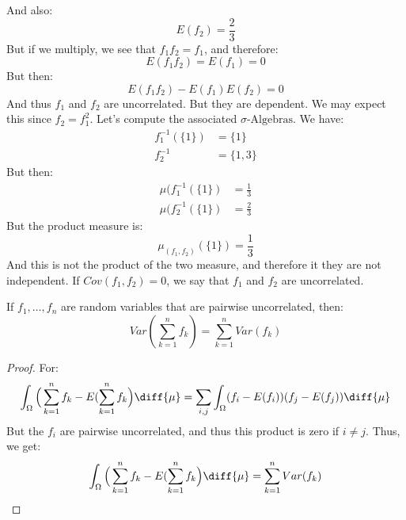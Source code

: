        And also:
        \begin{equation}
            E(f_{2})=\frac{2}{3}
        \end{equation}
        But if we multiply, we see that
        $f_{1}f_{2}=f_{1}$, and therefore:
        \begin{equation}
            E(f_{1}f_{2})=E(f_{1})=0
        \end{equation}
        But then:
        \begin{equation}
            E(f_{1}f_{2})-E(f_{1})E(f_{2})=0
        \end{equation}
        And thus $f_{1}$ and $f_{2}$ are uncorrelated.
        But they are dependent. We may expect this since
        $f_{2}=f_{1}^{2}$. Let's compute the associated
        $\sigma\textrm{-Algebras}$. We have:
        \begin{align}
            f_{1}^{\minus{1}}(\{1\})
            &=\{1\}\\
            f_{2}^{\minus{1}}&=\{1,3\}
        \end{align}
        But then:
        \begin{align}
            \mu(f_{1}^{\minus{1}}(\{1\})
            &=\frac{1}{3}\\
            \mu(f_{2}^{\minus{1}}(\{1\})&=\frac{2}{3}
        \end{align}
        But the product measure is:
        \begin{equation}
            \mu_{(f_{1},f_{2})}(\{1\})=\frac{1}{3}
        \end{equation}
        And this is not the product of the two measure, and
        therefore it they are not independent.
        If $Cov(f_{1},f_{2})=0$, we say that $f_{1}$ and
        $f_{2}$ are uncorrelated.
        \begin{theorem}
            If $f_{1},\dots,f_{n}$ are random variables
            that are pairwise uncorrelated, then:
            \begin{equation}
                Var(\sum_{k=1}^{n}f_{k})=
                \sum_{k=1}^{n}Var(f_{k})
            \end{equation}
        \end{theorem}
        \begin{proof}
            For:
            \begin{equation}
                \int_{\Omega}
                    \Big(\sum_{k=1}^{n}f_{k}-
                        E(\sum_{k=1}^{n}f_{k}\Big)\diff{\mu}
                =\sum_{i,j}\int_{\Omega}
                    (f_{i}-E(f_{i}))(f_{j}-E(f_{j}))\diff{\mu}
            \end{equation}
            But the $f_{i}$ are pairwise uncorrelated, and
            thus this product is zero if $i\ne{j}$. Thus, we
            get:
            \begin{equation}
                \int_{\Omega}
                    \Big(\sum_{k=1}^{n}f_{k}-
                        E(\sum_{k=1}^{n}f_{k}\Big)\diff{\mu}
                =\sum_{k=1}^{n}Var(f_{k})
            \end{equation}
        \end{proof}